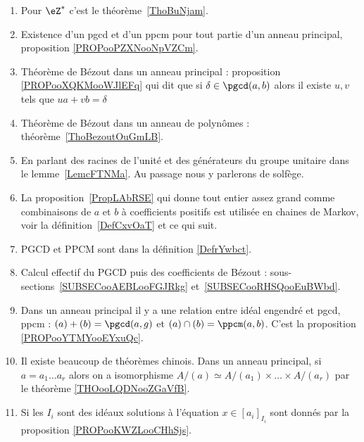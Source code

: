  \label{THEMEooNRZHooYuuHyt}
\begin{enumerate}
	\item
	      Pour \( \eZ^*\) c'est le théorème~\ref{ThoBuNjam}.
	\item
	      Existence d'un pgcd et d'un ppcm pour tout partie d'un anneau principal, proposition \ref{PROPooPZXNooNpVZCm}.
	\item
	      Théorème de Bézout dans un anneau principal : proposition \ref{PROPooXQKMooWJlEFq} qui dit que si \( \delta\in \pgcd(a,b) \) alors il existe \( u,v\) tels que \( ua+vb=\delta\)
	\item
	      Théorème de Bézout dans un anneau de polynômes : théorème~\ref{ThoBezoutOuGmLB}.
	\item
	      En parlant des racines de l'unité et des générateurs du groupe unitaire dans le lemme~\ref{LemcFTNMa}. Au passage nous y parlerons de solfège.
	\item
	      La proposition~\ref{PropLAbRSE} qui donne tout entier assez grand comme combinaisons de \( a \) et \( b\) à coefficients positifs est utilisée en chaines de Markov, voir la définition~\ref{DefCxvOaT} et ce qui suit.
	\item
	      PGCD et PPCM sont dans la définition \ref{DefrYwbct}.
	\item
	      Calcul effectif du PGCD puis des coefficients de Bézout : sous-sections~\ref{SUBSECooAEBLooFGJRkg} et~\ref{SUBSECooRHSQooEuBWbd}.
	\item
	      Dans un anneau principal il y a une relation entre idéal engendré et pgcd, ppcm : \( (a)+(b)=\pgcd(a,g)\) et \( (a)\cap(b)=\ppcm(a,b)\). C'est la proposition \ref{PROPooYTMYooEYxuQc}.
	\item
	      Il existe beaucoup de théorèmes chinois. Dans un anneau principal, si \( a=a_1\ldots a_r\) alors on a isomorphisme \( A/(a)\simeq A/(a_1)\times \ldots\times A/(a_r)\) par le théorème \ref{THOooLQDNooZGaVfB}.
	\item
	      Si les \( I_i\) sont des idéaux  solutions à l'équation \( x\in[a_i]_{I_i}\) sont donnés par la proposition \ref{PROPooKWZLooCHhSjs}.
\end{enumerate}
